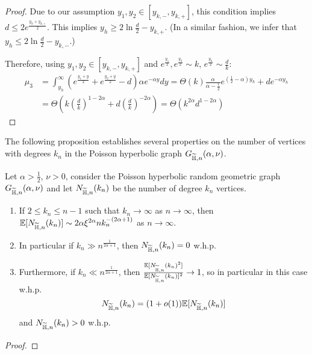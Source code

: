 \begin{appendices}
\begin{proof}
Due to our assumption $y_1, y_2 \in [y_{k,-},y_{k,+}]$, this condition implies $d \leq 2 e^{\frac{y_h+y_{k,+}}{2}}$. This implies $y_h \geq 2\ln \frac{d}{2} - y_{k,+}$. (In a similar fashion, we infer that $y_h \leq 2\ln \frac{d}{2} -y_{k,-}$.)

Therefore, using $y_1,y_2 \in [y_{k,-}, y_{k,+}]$ and $e^{\frac{y_1}{2}}, e^{\frac{y_2 }{2}} \sim k$, $e^{\frac{y_h}{2}} \sim \frac{d}{k}$:
\begin{align*}
\mu_3 &= \int_{y_h}^\infty (e^{\frac{y_1+y}{2}}+e^{\frac{y_2+y}{2}} - d) \alpha e^{-\alpha y} dy =\Theta(k)\frac{\alpha}{\alpha-\frac{1}{2}} e^{(\frac{1}{2}-\alpha) y_h} +d e^{-\alpha y_h} \\
&= \Theta(k (\frac{d}{k})^{1-2\alpha} +d(\frac{d}{k})^{-2\alpha}) = \Theta(k^{2\alpha} d^{1-2\alpha})
\end{align*}
\end{proof}

The following proposition establishes several properties on the number of vertices with degrees $k_n$ in the Poisson hyperbolic graph $G_{\widetilde{\mathbb{H}},n}(\alpha,\nu)$.

\begin{proposition}
Let $\alpha > \frac{1}{2}$, $\nu > 0$, consider the Poisson hyperbolic random geometric graph $G_{\widetilde{\mathbb{H}},n}(\alpha,\nu)$ and let $N_{\widetilde{\mathbb{H}},n}(k_n)$ be the number of degree $k_n$ vertices.
\begin{enumerate}
	\item If $2 \leq k_n \leq n-1$ such that $k_n \rightarrow \infty$ as $n \rightarrow \infty$, then $\mathbb{E}[N_{\widetilde{\mathbb{H}},n}(k_n)] \sim 2\alpha \xi^{2\alpha} n k_n^{-(2\alpha +1)}$ as $n \rightarrow \infty$.
	
	\item In particular if $k_n \gg n^{\frac{1}{2\alpha+1}}$, then $N_{\widetilde{\mathbb{H}},n}(k_n) = 0$ w.h.p.
	
	\item Furthermore, if $k_n \ll n^{\frac{1}{2\alpha+1}}$, then $\frac{\mathbb{E}[N_{\widetilde{\mathbb{H}},n}(k_n)^2]}{\mathbb{E}[N_{\widetilde{\mathbb{H}},n}(k_n)]^2} \rightarrow 1$, so in particular in this case w.h.p. $$N_{\widetilde{\mathbb{H}},n}(k_n) = (1+o(1))\mathbb{E}[N_{\widetilde{\mathbb{H}},n}(k_n)]$$ and $N_{\widetilde{\mathbb{H}},n}(k_n) > 0$ w.h.p.
\end{enumerate}
\end{proposition}

\begin{proof}
	

\end{proof}
\end{appendices}
